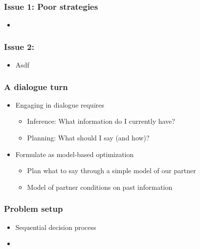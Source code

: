 \documentclass{beamer}
\begin{document}
\begin{frame}
\frametitle{Issue 1: Poor strategies}
\begin{itemize}
\item 
\end{itemize}
\end{frame}

\begin{frame}
\frametitle{Issue 2: }
\begin{itemize}
\item Asdf
\end{itemize}
\end{frame}

\begin{frame}
\frametitle{A dialogue turn}
\begin{itemize}
\item Engaging in dialogue requires
    \begin{itemize}
    \item Inference: What information do I currently have?
    \item Planning: What should I say (and how)?
    \end{itemize}
\item Formulate as model-based optimization
    \begin{itemize}
    \item Plan what to say through a simple model of our partner
    \item Model of partner conditions on past information
    \end{itemize}
\end{itemize}
\end{frame}

\begin{frame}
\frametitle{Problem setup}
\begin{itemize}
\item Sequential decision process
\item 
\end{itemize}
\end{frame}
\end{document}
